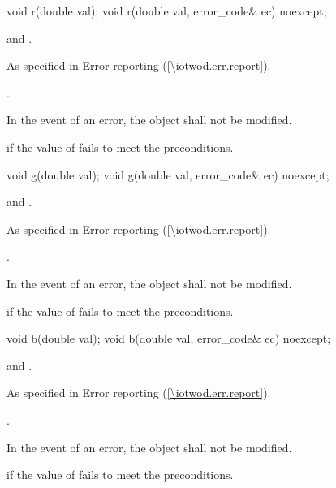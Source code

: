 \begin{itemdecl}
	void r(double val);
	void r(double val, error_code& ec) noexcept;
\end{itemdecl}

\begin{itemdescr}
	\pnum
	\requires
	 and .
	
	\pnum
	\throws
	As specified in Error reporting (\ref{\iotwod.err.report}).
	
	\pnum
	\postconditions
	.

	\pnum
	\remarks
	In the event of an error, the object shall not be modified.
	
	\pnum
	\errors
	 if the value of  fails to meet the preconditions.
	
\end{itemdescr}

\begin{itemdecl}
	void g(double val);
	void g(double val, error_code& ec) noexcept;
\end{itemdecl}
\begin{itemdescr}
	\pnum
	\requires
	 and .
		
	\pnum
	\throws
	As specified in Error reporting (\ref{\iotwod.err.report}).
	
	\pnum
	\postconditions
	.

	\pnum
	\remarks
	In the event of an error, the object shall not be modified.
	
	\pnum
	\errors
	 if the value of  fails to meet the preconditions.
	
\end{itemdescr}

\begin{itemdecl}
	void b(double val);
	void b(double val, error_code& ec) noexcept;
\end{itemdecl}
\begin{itemdescr}
	\pnum
	\requires
	 and .
	
	\pnum
	\throws
	As specified in Error reporting (\ref{\iotwod.err.report}).
	
	\pnum
	\postconditions
	.

	\pnum
	\remarks
	In the event of an error, the object shall not be modified.
	
	\pnum
	\errors
	 if the value of  fails to meet the preconditions.
	
\end{itemdescr}

